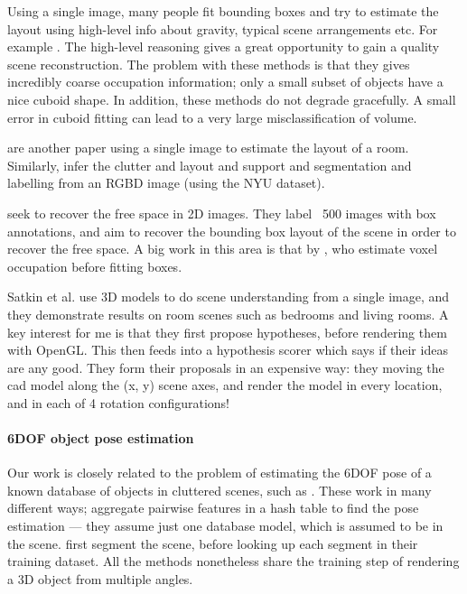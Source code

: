 \documentclass[10pt,twocolumn,letterpaper]{article}
\makeatletter
\newcommand*{\ea}{et al.\@\xspace}
\makeatother
\begin{document}
Using a single image, many people fit bounding boxes and try to estimate the layout using high-level info about gravity, typical scene arrangements etc. 
For example \cite{choi-cvpr-2013, shao-siggraphasia-2014}.
The high-level reasoning gives a great opportunity to gain a quality scene reconstruction.
The problem with these methods is that they gives incredibly coarse occupation information; only a small subset of objects have a nice cuboid shape.
In addition, these methods do not degrade gracefully.
A small error in cuboid fitting can lead to a very large misclassification of volume.

\cite{lee-nips-2010} are another paper using a single image to estimate the layout of a room. 
Similarly, \cite{zhang-iccv-2013} infer the clutter and layout and support and segmentation and labelling from an RGBD image (using the NYU dataset).

\cite{hedau-cvpr-2012} seek to recover the free space in 2D images. 
They label ~500 images with box annotations, and aim to recover the bounding box layout of the scene in order to recover the free space. 
A big work in this area is that by \cite{gupta-cvpr-2011}, who estimate voxel occupation before fitting boxes.

Satkin \ea \cite{satkin-bmvc-2012} use 3D models to do scene understanding from a single image, and they demonstrate results on room scenes such as bedrooms and living rooms. 
A key interest for me is that they first propose hypotheses, before rendering them with OpenGL.
This then feeds into a hypothesis scorer which says if their ideas are any good. 
They form their proposals in an expensive way: they moving the cad model along the (x, y) scene axes, and render the model in every location, and in each of 4 rotation configurations!

\paragraph{6DOF object pose estimation}
Our work is closely related to the problem of estimating the 6DOF pose of a known database of objects in cluttered scenes, such as \cite{hinterstoisser-accv-2012, drost-3dimpvt-2012, rusu-iros-2010}. 
These work in many different ways; \cite{drost-3dimpvt-2012} aggregate pairwise features in a hash table to find the pose estimation --- they assume just one database model, which is assumed to be in the scene. \cite{rusu-iros-2010} first segment the scene, before looking up each segment in their training dataset.
All the methods nonetheless share the training step of rendering a 3D object from multiple angles.
\end{document}
